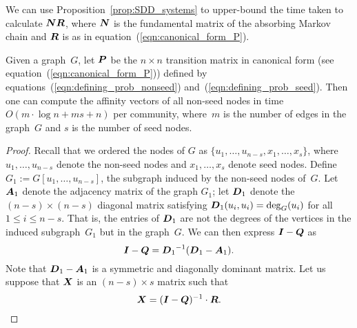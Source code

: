 We can use Proposition~\ref{prop:SDD_systems} to upper-bound the time taken to 
calculate $\boldsymbol{N} \boldsymbol{R}$, where $\boldsymbol{N}$ is the fundamental matrix of the absorbing
Markov chain and $\boldsymbol{R}$ is as in equation~(\ref{eqn:canonical_form_P}).
\begin{lemma}\label{lemma:computing_NR}
Given a graph~$G$, let $\boldsymbol{P}$ be the $n \times n$ transition matrix in canonical form 
(see equation~(\ref{eqn:canonical_form_P})) defined by equations~(\ref{eqn:defining_prob_nonseed}) 
and~(\ref{eqn:defining_prob_seed}). Then one can compute 
the affinity vectors of all non-seed nodes in time $O(m \cdot \log n + ms + n)$ per community, 
where~$m$ is the number of edges in the graph~$G$ and $s$ is the number of seed nodes.
\end{lemma}  
\begin{proof}
Recall that we ordered the nodes of $G$ as $\{u_1, \ldots, u_{n - s}, x_1, \ldots, x_s\}$, 
where $u_1, \ldots, u_{n - s}$ denote the non-seed nodes and $x_1, \ldots, x_s$ denote 
seed nodes. Define $G_1 := G[u_1, \ldots, u_{n - s}]$, the subgraph induced by the non-seed nodes 
of~$G$. Let $\boldsymbol{A}_1$ denote the adjacency matrix of the graph $G_1$; let 
$\boldsymbol{D}_1$ denote the $(n - s) \times (n - s)$ diagonal matrix satisfying 
$\boldsymbol{D}_1(u_i, u_i) = \deg_{G}(u_i)$ for all $1 \leq i \leq n - s$.  That is, the 
entries of $\boldsymbol{D}_1$ are not the degrees of the vertices in the induced subgraph~$G_1$ 
but in the graph~$G$. We can then express 
$\boldsymbol{I} - \boldsymbol{Q}$ as 
\begin{equation} \label{eqn:I-Q}
	\boldsymbol{I}  - \boldsymbol{Q} = {\boldsymbol{D}_1}^{-1} (\boldsymbol{D}_1 - \boldsymbol{A}_1).
\end{equation}
Note that $\boldsymbol{D}_1 - \boldsymbol{A}_1$ is a symmetric and diagonally dominant matrix. 
Let us suppose that $\boldsymbol{X}$ is an $(n - s) \times s$ matrix such that 
\[
	\boldsymbol{X} = (\boldsymbol{I} - \boldsymbol{Q})^{-1} \cdot \boldsymbol{R}.
\]


\end{proof}
